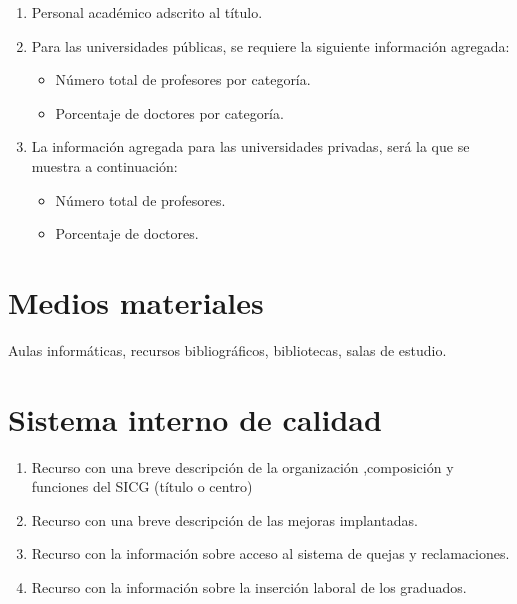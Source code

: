 \begin{enumerate}

    \item Personal académico adscrito al título.

    \item Para las universidades públicas, se requiere la siguiente información agregada:

        \begin{itemize}

            \item Número total de profesores por categoría.

            \item Porcentaje de doctores por categoría.

        \end{itemize}

    \item La información agregada para las universidades privadas, será la que
        se muestra a continuación:

        \begin{itemize}

            \item Número total de profesores.

            \item Porcentaje de doctores.

        \end{itemize}

\end{enumerate}

\section{Medios materiales}

Aulas informáticas, recursos bibliográficos, bibliotecas, salas de estudio.

\section{Sistema interno de calidad}

\begin{enumerate}

    \item Recurso con una breve descripción de la organización ,composición y funciones del SICG
        (título o centro)

    \item Recurso con una breve descripción de las mejoras implantadas.

    \item Recurso con la información sobre acceso al sistema de quejas y reclamaciones.

    \item Recurso con la información sobre la inserción laboral de los graduados.

\end{enumerate}


